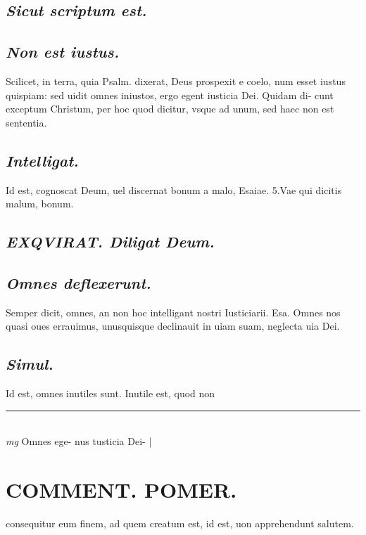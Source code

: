 \documentclass{article}
\begin{document}
\begin{pages}
\subsection*{\textit{Sicut scriptum est. }}
{}
\subsection*{\textit{Non est iustus. }}\pstart Scilicet, in terra, quia Psalm. dixerat, Deus prospexit e coelo, num esset iustus quispiam: sed uidit omnes iniustos, ergo egent iusticia Dei. Quidam di- cunt exceptum Christum, per hoc quod dicitur, vsque  ad unum, sed haec non est sententia.   \pend
{}
{}
\subsection*{\textit{Intelligat. }}\pstart Id est, cognoscat Deum, uel discernat bonum a malo, Esaiae. 5.Vae qui dicitis malum, bonum.  \pend
{}
{}
\subsection*{\textit{EXQVIRAT. Diligat Deum. }}
{}
\subsection*{\textit{Omnes deflexerunt. }}\pstart Semper dicit, omnes, an non hoc intelligant nostri Iusticiarii. Esa. Omnes nos quasi oues errauimus, unusquisque declinauit in uiam suam, neglecta uia Dei.  \pend
{}
{}
\subsection*{\textit{Simul. }}\pstart Id est, omnes inutiles sunt. Inutile est, quod non  \pend
\vspace{0.5cm}\noindent
\vspace{0.2cm}\rule{1cm}{0.2pt}\\ 
\hspace{0.2cm}\textit{mg}
\footnotesize Omnes ege- nus tusticia Dei- 
\normalsize| 
\section*{COMMENT. POMER.  }\pstart consequitur eum finem, ad quem creatum est, id est, uon apprehendunt salutem.   \pend
{}
{}

\end{pages}
\end{document}
